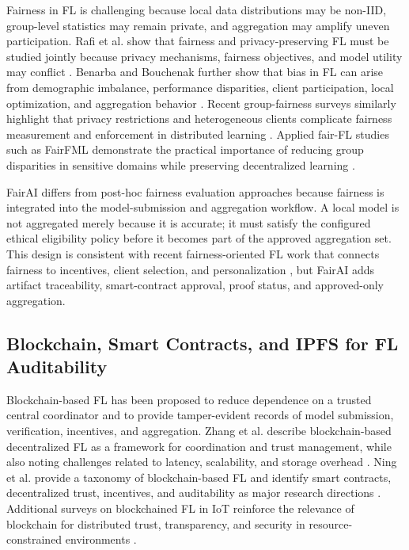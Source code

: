 \documentclass[futureinternet,article,submit,pdftex,moreauthors]{Definitions/mdpi}
\begin{document}
Fairness in FL is challenging because local data distributions may be non-IID, group-level statistics may remain private, and aggregation may amplify uneven participation. Rafi et al. show that fairness and privacy-preserving FL must be studied jointly because privacy mechanisms, fairness objectives, and model utility may conflict \cite{intro_4}. Benarba and Bouchenak further show that bias in FL can arise from demographic imbalance, performance disparities, client participation, local optimization, and aggregation behavior \cite{intro_5}. Recent group-fairness surveys similarly highlight that privacy restrictions and heterogeneous clients complicate fairness measurement and enforcement in distributed learning \cite{rw_16}. Applied fair-FL studies such as FairFML demonstrate the practical importance of reducing group disparities in sensitive domains while preserving decentralized learning \cite{rw_17}.

FairAI differs from post-hoc fairness evaluation approaches because fairness is integrated into the model-submission and aggregation workflow. A local model is not aggregated merely because it is accurate; it must satisfy the configured ethical eligibility policy before it becomes part of the approved aggregation set. This design is consistent with recent fairness-oriented FL work that connects fairness to incentives, client selection, and personalization \cite{rw_18,rw_19}, but FairAI adds artifact traceability, smart-contract approval, proof status, and approved-only aggregation.

\subsection{Blockchain, Smart Contracts, and IPFS for FL Auditability}
\label{subsec:rw-blockchain-ipfs}

Blockchain-based FL has been proposed to reduce dependence on a trusted central coordinator and to provide tamper-evident records of model submission, verification, incentives, and aggregation. Zhang et al. describe blockchain-based decentralized FL as a framework for coordination and trust management, while also noting challenges related to latency, scalability, and storage overhead \cite{intro_6}. Ning et al. provide a taxonomy of blockchain-based FL and identify smart contracts, decentralized trust, incentives, and auditability as major research directions \cite{intro_7}. Additional surveys on blockchained FL in IoT reinforce the relevance of blockchain for distributed trust, transparency, and security in resource-constrained environments \cite{rw_20}.
\end{document}
